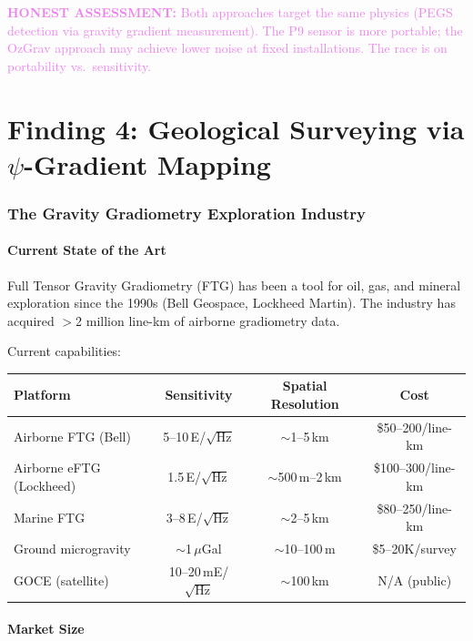 \documentclass[11pt]{article}
\theoremstyle{definition}
\theoremstyle{remark}
\newcommand{\honest}[1]{\textcolor{violet}{\textbf{HONEST ASSESSMENT:} #1}}
\begin{document}
\honest{Both approaches target the same physics (PEGS detection via
gravity gradient measurement). The P9 sensor is more portable; the OzGrav
approach may achieve lower noise at fixed installations. The race is on
portability vs.\ sensitivity.}

\part{Finding 4: Geological Surveying via $\psi$-Gradient Mapping}
\label{part:geological}

\section{The Gravity Gradiometry Exploration Industry}
\label{sec:industry}

\subsection{Current State of the Art}

Full Tensor Gravity Gradiometry (FTG) has been a tool for oil, gas, and mineral
exploration since the 1990s (Bell Geospace, Lockheed Martin). The industry has
acquired $>$2 million line-km of airborne gradiometry data.

Current capabilities:
\begin{center}
\begin{tabular}{lccc}
\toprule
\textbf{Platform} & \textbf{Sensitivity} & \textbf{Spatial Resolution} & \textbf{Cost} \\
\midrule
Airborne FTG (Bell) & 5--10\,E/$\sqrt{\text{Hz}}$ & $\sim$1--5\,km & \$50--200/line-km \\
Airborne eFTG (Lockheed) & 1.5\,E/$\sqrt{\text{Hz}}$ & $\sim$500\,m--2\,km & \$100--300/line-km \\
Marine FTG & 3--8\,E/$\sqrt{\text{Hz}}$ & $\sim$2--5\,km & \$80--250/line-km \\
Ground microgravity & $\sim$1\,$\mu$Gal & $\sim$10--100\,m & \$5--20K/survey \\
GOCE (satellite) & 10--20\,mE/$\sqrt{\text{Hz}}$ & $\sim$100\,km & N/A (public) \\
\bottomrule
\end{tabular}
\end{center}

\subsection{Market Size}
\end{document}
